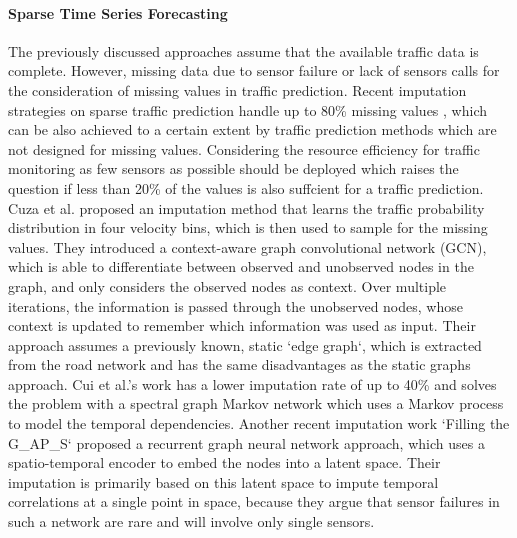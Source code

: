 \paragraph*{\textbf{Sparse Time Series Forecasting}}
The previously discussed approaches assume that the available traffic data is complete.
However, missing data due to sensor failure or lack of sensors calls for the consideration of missing values in traffic prediction.
Recent imputation strategies on sparse traffic prediction handle up to 80\% missing values \cite{Cuza22}, which can be also achieved to a certain extent by traffic prediction methods which are not designed for missing values.
Considering the resource efficiency for traffic monitoring as few sensors as possible should be deployed which raises the question if less than 20\% of the values is also suffcient for a traffic prediction.
Cuza et al. \cite{Cuza22} proposed an imputation method that learns the traffic probability distribution in four velocity bins, which is then used to sample for the missing values.
They introduced a context-aware graph convolutional network (GCN), which is able to differentiate between observed and unobserved nodes in the graph, and only considers the observed nodes as context.
Over multiple iterations, the information is passed through the unobserved nodes, whose context is updated to remember which information was used as input.
Their approach assumes a previously known, static `edge graph`, which is extracted from the road network and has the same disadvantages as the static graphs approach.
Cui et al.'s work \cite{Cui20} has a lower imputation rate of up to 40\% and solves the problem with a spectral graph Markov network which uses a Markov process to model the temporal dependencies.
Another recent imputation work `Filling the G\_AP\_S` \cite{Cini22} proposed a recurrent graph neural network approach, which uses a spatio-temporal encoder to embed the nodes into a latent space.
Their imputation is primarily based on this latent space to impute temporal correlations at a single point in space, because they argue that sensor failures in such a network are rare and will involve only single sensors.

